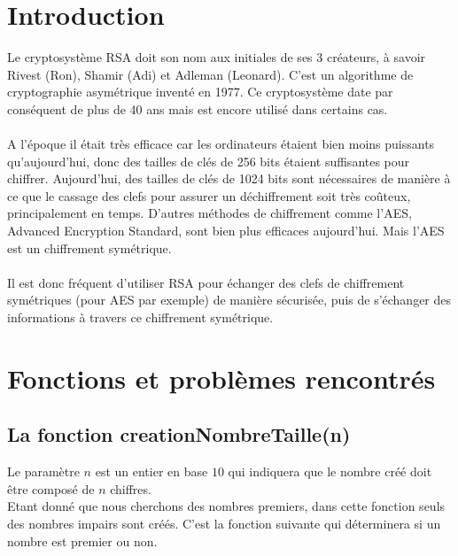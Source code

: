\documentclass[12pt]{article}
\theoremstyle{definition}
\begin{document}
\tableofcontents
\pagebreak

\section*{Introduction}
Le cryptosystème RSA doit son nom aux initiales de ses 3 créateurs, à savoir Rivest (Ron), Shamir (Adi) et Adleman (Leonard). C'est un algorithme de cryptographie asymétrique inventé en 1977. Ce cryptosystème date par conséquent de plus de 40 ans mais est encore utilisé dans certains cas.\\\\
A l'époque il était très efficace car les ordinateurs étaient bien moins puissants qu'aujourd'hui, donc des tailles de clés de 256 bits étaient suffisantes pour chiffrer. Aujourd'hui, des tailles de clés de 1024 bits sont nécessaires de manière à ce que le cassage des clefs pour assurer un déchiffrement soit très coûteux, principalement en temps. D'autres méthodes de chiffrement comme l'AES, Advanced Encryption Standard, sont bien plus efficaces aujourd'hui. Mais l'AES est un chiffrement symétrique.\\\\
Il est donc fréquent d'utiliser RSA pour échanger des clefs de chiffrement symétriques (pour AES par exemple) de manière sécurisée, puis de s'échanger des informations à travers ce chiffrement symétrique.
\vfill \eject

\section{Fonctions et problèmes rencontrés}
\vspace{12pt}
	\subsection{La fonction creationNombreTaille(n)}
	Le paramètre $n$ est un entier en base $10$ qui indiquera que le nombre créé doit être composé de $n$ chiffres.\\
	Etant donné que nous cherchons des nombres premiers, dans cette fonction seuls des nombres impairs sont créés. C'est la fonction suivante qui déterminera si un nombre est premier ou non.	
\end{document}
